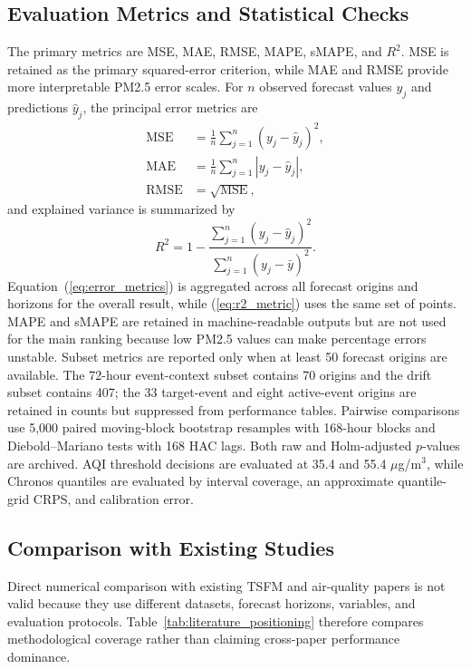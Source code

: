 \documentclass{ieeeaccess}
\begin{document}
\subsection{Evaluation Metrics and Statistical Checks}
The primary metrics are MSE, MAE, RMSE, MAPE, sMAPE, and $R^2$. MSE is retained
as the primary squared-error criterion, while MAE and RMSE provide more
interpretable PM2.5 error scales. For $n$ observed forecast values $y_j$ and
predictions $\hat{y}_j$, the principal error metrics are
\begin{equation}
\begin{aligned}
\operatorname{MSE}&=\frac{1}{n}\sum_{j=1}^{n}(y_j-\hat{y}_j)^2,\\
\operatorname{MAE}&=\frac{1}{n}\sum_{j=1}^{n}|y_j-\hat{y}_j|,\\
\operatorname{RMSE}&=\sqrt{\operatorname{MSE}},
\end{aligned}
\label{eq:error_metrics}
\end{equation}
and explained variance is summarized by
\begin{equation}
R^2=1-\frac{\sum_{j=1}^{n}(y_j-\hat{y}_j)^2}
{\sum_{j=1}^{n}(y_j-\bar{y})^2}.
\label{eq:r2_metric}
\end{equation}
Equation~(\ref{eq:error_metrics}) is aggregated across all forecast origins and
horizons for the overall result, while (\ref{eq:r2_metric}) uses the same set of
points. MAPE and sMAPE are retained in machine-readable outputs but are not used
for the main ranking because low PM2.5 values can make percentage errors
unstable. Subset metrics are reported only when at least
50 forecast origins are available. The 72-hour event-context subset contains 70
origins and the drift subset contains 407; the 33 target-event and eight
active-event origins are retained in counts but suppressed from performance
tables. Pairwise comparisons use 5,000 paired moving-block bootstrap resamples
with 168-hour blocks and Diebold--Mariano tests with 168 HAC lags. Both raw and
Holm-adjusted $p$-values are archived. AQI threshold decisions are evaluated at
35.4 and 55.4 $\mu$g/m$^3$, while Chronos quantiles are evaluated by interval
coverage, an approximate quantile-grid CRPS, and calibration error.

\subsection{Comparison with Existing Studies}
Direct numerical comparison with existing TSFM and air-quality papers is not
valid because they use different datasets, forecast horizons, variables, and
evaluation protocols. Table~\ref{tab:literature_positioning} therefore compares
methodological coverage rather than claiming cross-paper performance dominance.
\end{document}
